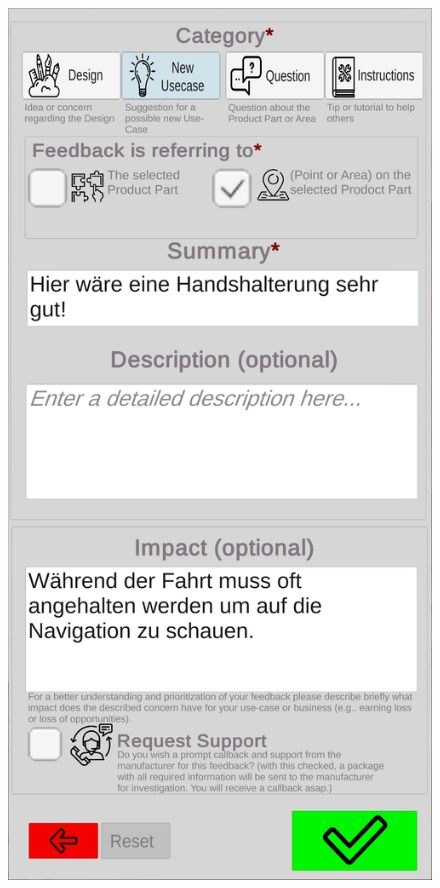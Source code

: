 \begin{figure}[H]
\begin{minipage}{.45\textwidth}
		\label{fig:firstform}
	\end{minipage}%
	\begin{minipage}{.45\textwidth}
		\centering
		\includegraphics[width=.95\linewidth]{resources/implementation/secondform.jpg}
		\label{fig:secondform}
	\end{minipage}
\end{figure}

